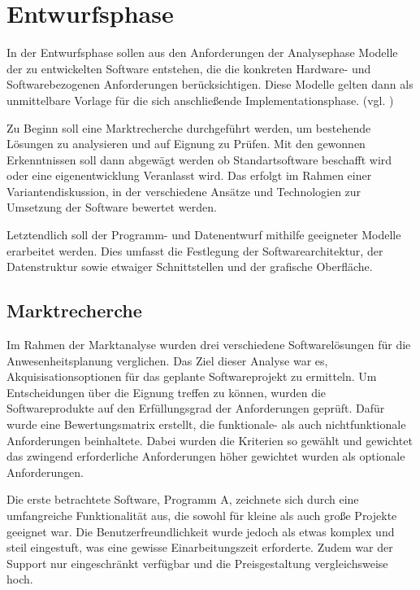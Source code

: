\section{Entwurfsphase}
\label{sec:Entwurfsphase}
In der Entwurfsphase sollen aus den Anforderungen der Analysephase Modelle der zu entwickelten Software entstehen, die die konkreten Hardware- und Softwarebezogenen Anforderungen berücksichtigen. Diese Modelle gelten dann als unmittelbare Vorlage für die sich anschließende Implementationsphase. (vgl. \cite[S. 69]{dumke-2003})

Zu Beginn soll eine Marktrecherche durchgeführt werden, um bestehende Lösungen zu analysieren und auf Eignung zu Prüfen. Mit den gewonnen Erkenntnissen soll dann abgewägt werden ob Standartsoftware beschafft wird oder eine eigenentwicklung Veranlasst wird. Das erfolgt im Rahmen einer Variantendiskussion, in der verschiedene Ansätze und Technologien zur Umsetzung der Software bewertet werden.

Letztendlich soll der Programm- und Datenentwurf mithilfe geeigneter Modelle erarbeitet werden. Dies umfasst die Festlegung der Softwarearchitektur, der Datenstruktur sowie etwaiger Schnittstellen und der grafische Oberfläche.

\subsection{Marktrecherche}
\label{sec:Marktrecherche}
Im Rahmen der Marktanalyse wurden drei verschiedene Softwarelösungen für die Anwesenheitsplanung verglichen. Das Ziel dieser Analyse war es, Akquisisationsoptionen für das geplante Softwareprojekt zu ermitteln. Um Entscheidungen über die Eignung treffen zu können, wurden die Softwareprodukte auf den Erfüllungsgrad der Anforderungen geprüft. Dafür wurde eine Bewertungsmatrix erstellt, die funktionale- als auch nichtfunktionale Anforderungen beinhaltete. Dabei wurden die Kriterien so gewählt und gewichtet das zwingend erforderliche Anforderungen höher gewichtet wurden als optionale Anforderungen.


Die erste betrachtete Software, Programm A, zeichnete sich durch eine umfangreiche Funktionalität aus, die sowohl für kleine als auch große Projekte geeignet war. Die Benutzerfreundlichkeit wurde jedoch als etwas komplex und steil eingestuft, was eine gewisse Einarbeitungszeit erforderte. Zudem war der Support nur eingeschränkt verfügbar und die Preisgestaltung vergleichsweise hoch.

